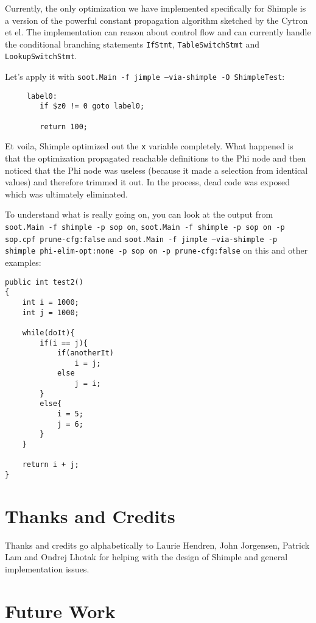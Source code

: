 \documentclass[10pt,letterpaper,oneside,onecolumn]{article}
\begin{document}
Currently, the only optimization we have implemented specifically for
Shimple is a version of the powerful constant propagation algorithm
sketched by the Cytron et el.  The implementation can reason about
control flow and can currently handle the conditional branching
statements {\tt IfStmt}, {\tt TableSwitchStmt} and {\tt
LookupSwitchStmt}.

Let's apply it with {\tt soot.Main -f jimple --via-shimple -O ShimpleTest}:

\begin{verbatim}
     label0:
        if $z0 != 0 goto label0;

        return 100;
\end{verbatim}

Et voila, Shimple optimized out the {\tt x} variable completely. What
happened is that the optimization propagated reachable definitions to
the Phi node and then noticed that the Phi node was useless (because
it made a selection from identical values) and therefore trimmed it
out.  In the process, dead code was exposed which was ultimately
eliminated.

To understand what is really going on, you can look at the output from
{\tt soot.Main -f shimple -p sop on}, {\tt soot.Main -f shimple -p sop
on -p sop.cpf prune-cfg:false} and {\tt soot.Main -f jimple
--via-shimple -p shimple phi-elim-opt:none -p sop on -p
prune-cfg:false} on this and other examples:

\begin{verbatim}
public int test2()
{
    int i = 1000;
    int j = 1000;

    while(doIt){
        if(i == j){
            if(anotherIt)
                i = j;
            else
                j = i;
        }
        else{
            i = 5;
            j = 6;
        }
    }

    return i + j;
}
\end{verbatim}

\section{Thanks and Credits}

Thanks and credits go alphabetically to Laurie Hendren, John
Jorgensen, Patrick Lam and Ondrej Lhotak for helping with the design
of Shimple and general implementation issues.

\section{Future Work}
\end{document}
